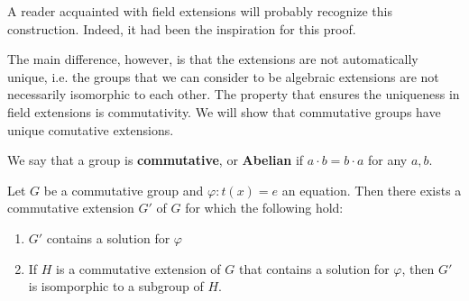 A reader acquainted with field extensions will probably recognize this construction. Indeed, it had been the inspiration for this proof.

The main difference, however, is that the extensions are not automatically unique, i.e. the groups that we can consider to be algebraic extensions are not necessarily isomorphic to each other. The property that ensures the uniqueness in field extensions is commutativity. We will show that commutative groups have unique comutative extensions.

\begin{defn}
	We say that a group is \textbf{commutative}, or \textbf{Abelian} if $a\cdot b = b \cdot a$ for any $a,b$.
\end{defn}

\begin{thm}
\label{theorem:abelian uniqueness}
	Let $G$ be a commutative group and $\varphi:t(x)=e$ an equation. Then there exists a commutative extension $G'$ of $G$ for which the following hold:
	\begin{enumerate}
	\item $G'$ contains a solution for $\varphi$
	\item If $H$ is a commutative extension of $G$ that contains a solution for $\varphi$, then $G'$ is isomporphic to a subgroup of $H$.
\end{enumerate}	 
\end{thm}
